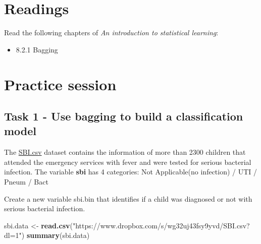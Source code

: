 \documentclass[
]{book}
\newenvironment{Shaded}{\begin{snugshade}}{\end{snugshade}}
\newcommand{\FunctionTok}[1]{\textcolor[rgb]{0.13,0.29,0.53}{\textbf{#1}}}
\newcommand{\NormalTok}[1]{#1}
\newcommand{\OtherTok}[1]{\textcolor[rgb]{0.56,0.35,0.01}{#1}}
\newcommand{\StringTok}[1]{\textcolor[rgb]{0.31,0.60,0.02}{#1}}
\providecommand{\tightlist}{%
  \setlength{\itemsep}{0pt}\setlength{\parskip}{0pt}}
\begin{document}
\section{Readings}\label{BA2}

Read the following chapters of \emph{An introduction to statistical learning}:

\begin{itemize}
\tightlist
\item
  8.2.1 Bagging
\end{itemize}

\section{Practice session}\label{BA3}

\subsection*{Task 1 - Use bagging to build a classification model}\label{task-1---use-bagging-to-build-a-classification-model}

The \href{https://www.dropbox.com/s/da3by5vuzkv77xi/SBI.csv?dl=1}{SBI.csv} dataset
contains the information of more than 2300 children that attended the
emergency services with fever and were tested for serious bacterial infection.
The variable \textbf{sbi} has
4 categories: Not Applicable(no infection) / UTI / Pneum / Bact

Create a new variable sbi.bin that identifies if a child was diagnosed
or not with serious bacterial infection.

\begin{Shaded}
\begin{Highlighting}[]
\NormalTok{sbi.data }\OtherTok{\textless{}{-}} \FunctionTok{read.csv}\NormalTok{(}\StringTok{"https://www.dropbox.com/s/wg32uj43fsy9yvd/SBI.csv?dl=1"}\NormalTok{)}
\FunctionTok{summary}\NormalTok{(sbi.data)}
\end{Highlighting}
\end{Shaded}
\end{document}

